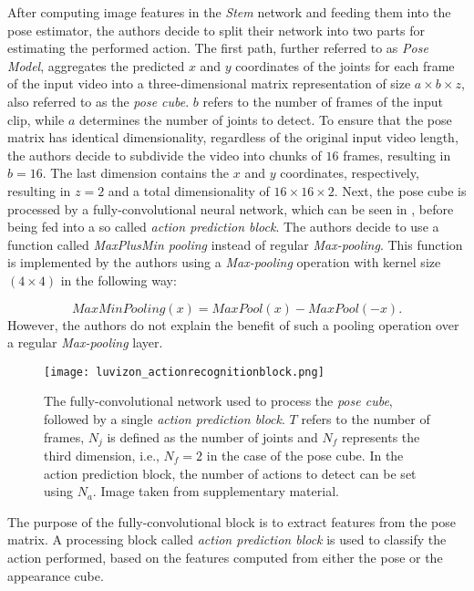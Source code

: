 After computing image features in the \textit{Stem} network and feeding them into the pose estimator, the authors decide to split their network into two parts for estimating the performed action.
The first path, further referred to as \textit{Pose Model}, aggregates the predicted $x$ and $y$ coordinates of the joints for each frame of the input video into a three-dimensional matrix representation of size $a \times b \times z$, also referred to as the \textit{pose cube}.
$b$ refers to the number of frames of the input clip, while $a$ determines the number of joints to detect.
To ensure that the pose matrix has identical dimensionality, regardless of the original input video length, the authors decide to subdivide the video into chunks of $16$ frames, resulting in $b=16$.
The last dimension contains the $x$ and $y$ coordinates, respectively, resulting in $z=2$ and a total dimensionality of $16 \times 16 \times 2$.
Next, the pose cube is processed by a fully-convolutional neural network, which can be seen in , before being fed into a so called \textit{action prediction block}.
The authors decide to use a function called \textit{MaxPlusMin pooling} instead of regular \textit{Max-pooling}.
This function is implemented by the authors using a \textit{Max-pooling} operation with kernel size $(4 \times 4)$ in the following way:

\begin{equation}
    MaxMinPooling(x) = MaxPool(x) - MaxPool(-x).
\end{equation}
However, the authors do not explain the benefit of such a pooling operation over a regular \textit{Max-pooling} layer.

\begin{figure}[htb!]
    \centering
    \texttt{[image: luvizon\_actionrecognitionblock.png]}
    \caption{The fully-convolutional network used to process the \textit{pose cube}, followed by a single \textit{action prediction block}. $T$ refers to the number of frames, $N_j$ is defined as the number of joints and $N_f$ represents the third dimension, i.e., $N_f = 2$ in the case of the pose cube. In the action prediction block, the number of actions to detect can be set using $N_a$. Image taken from \cite{luvizon_2d/3d_2018} supplementary material.}
    \label{fig:luvizon_actionrecognitionblock}
\end{figure}

The purpose of the fully-convolutional block is to extract features from the pose matrix.
A processing block called \textit{action prediction block} is used to classify the action performed, based on the features computed from either the pose or the appearance cube.

